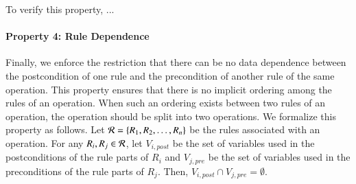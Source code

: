 To verify this property, ...

\paragraph*{Property 4: Rule Dependence}
Finally, we enforce the restriction that there can be no data dependence between
the postcondition of one rule and the precondition of another rule of the same
operation. This property ensures that there is no implicit ordering among the
rules of an operation. When such an ordering exists between two rules of an
operation, the operation should be split into two operations. We formalize this
property as follows. Let ${\cal R} = \{R_1, R_2, \ldots, R_n\}$ be the rules
associated with an operation. For any $R_i, R_j \in {\cal R}$, let $V_{i,
  \mathit{post}}$ be the set of variables used in the postconditions of the rule
parts of $R_i$ and $V_{j, \mathit{pre}}$ be the set of variables used in the
preconditions of the rule parts of $R_j$. Then, $V_{i, \mathit{post}} \cap V_{j,
  \mathit{pre}} = \emptyset$.

